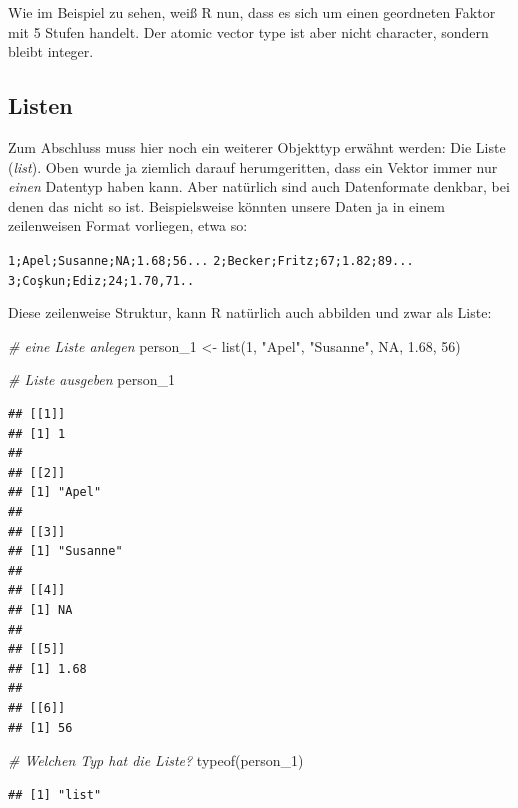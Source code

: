 \documentclass[
]{book}
\newenvironment{Shaded}{\begin{snugshade}}{\end{snugshade}}
\newcommand{\CommentTok}[1]{\textcolor[rgb]{0.56,0.35,0.01}{\textit{#1}}}
\newcommand{\ConstantTok}[1]{\textcolor[rgb]{0.00,0.00,0.00}{#1}}
\newcommand{\DecValTok}[1]{\textcolor[rgb]{0.00,0.00,0.81}{#1}}
\newcommand{\FloatTok}[1]{\textcolor[rgb]{0.00,0.00,0.81}{#1}}
\newcommand{\FunctionTok}[1]{\textcolor[rgb]{0.00,0.00,0.00}{#1}}
\newcommand{\NormalTok}[1]{#1}
\newcommand{\OtherTok}[1]{\textcolor[rgb]{0.56,0.35,0.01}{#1}}
\newcommand{\StringTok}[1]{\textcolor[rgb]{0.31,0.60,0.02}{#1}}
\begin{document}
Wie im Beispiel zu sehen, weiß R nun, dass es sich um einen geordneten Faktor mit 5 Stufen handelt. Der atomic vector type ist aber nicht character, sondern bleibt integer.

\hypertarget{listen}{%
\subsection{Listen}\label{listen}}

Zum Abschluss muss hier noch ein weiterer Objekttyp erwähnt werden: Die Liste (\emph{list}). Oben wurde ja ziemlich darauf herumgeritten, dass ein Vektor immer nur \emph{einen} Datentyp haben kann. Aber natürlich sind auch Datenformate denkbar, bei denen das nicht so ist. Beispielsweise könnten unsere Daten ja in einem zeilenweisen Format vorliegen, etwa so:

\texttt{1;Apel;Susanne;NA;1.68;56...}
\texttt{2;Becker;Fritz;67;1.82;89...}
\texttt{3;Coşkun;Ediz;24;1.70,71..}

Diese zeilenweise Struktur, kann R natürlich auch abbilden und zwar als Liste:

\begin{Shaded}
\begin{Highlighting}[]
\CommentTok{\# eine Liste anlegen}
\NormalTok{person\_1 }\OtherTok{\textless{}{-}} \FunctionTok{list}\NormalTok{(}\DecValTok{1}\NormalTok{, }\StringTok{"Apel"}\NormalTok{, }\StringTok{"Susanne"}\NormalTok{, }\ConstantTok{NA}\NormalTok{, }\FloatTok{1.68}\NormalTok{, }\DecValTok{56}\NormalTok{)}

\CommentTok{\# Liste ausgeben}
\NormalTok{person\_1}
\end{Highlighting}
\end{Shaded}

\begin{verbatim}
## [[1]]
## [1] 1
## 
## [[2]]
## [1] "Apel"
## 
## [[3]]
## [1] "Susanne"
## 
## [[4]]
## [1] NA
## 
## [[5]]
## [1] 1.68
## 
## [[6]]
## [1] 56
\end{verbatim}

\begin{Shaded}
\begin{Highlighting}[]
\CommentTok{\# Welchen Typ hat die Liste?}
\FunctionTok{typeof}\NormalTok{(person\_1)}
\end{Highlighting}
\end{Shaded}

\begin{verbatim}
## [1] "list"
\end{verbatim}
\end{document}
